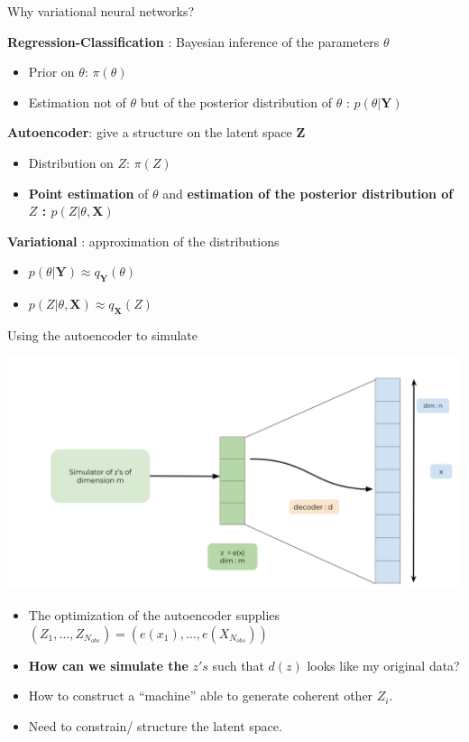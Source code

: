 \documentclass[compress,10pt]{beamer}
\begin{document}
\begin{frame}{Why variational neural networks?}

  \textbf{Regression-Classification} : Bayesian inference of the
  parameters \(\theta\)
\begin{itemize}
\item
   Prior on \(\theta\): \(\pi(\theta)\)
\item
  Estimation not of \(\theta\) but of the posterior distribution of
  \(\theta\) : \(p(\theta | \mathbf{Y})\)
\end{itemize}

  \textbf{Autoencoder}: give a structure on the latent space
  \(\mathbf{Z}\)
  
\begin{itemize}

\item
  Distribution  on \(Z\): \(\pi(Z)\)
\item
  \textbf{Point estimation} of \(\theta\) and \textbf{estimation of  the posterior distribution of \(Z\) :
  \(p(Z | \theta, \mathbf{X})\)}
\end{itemize}


 \textbf{Variational} : approximation of the distributions
\begin{itemize}
 \item
  \(p(\theta | \mathbf{Y}) \approx q_\mathbf{Y}(\theta)\)
\item
  \(p(Z | \theta, \mathbf{X}) \approx q_\mathbf{X}(Z)\)
\end{itemize}
\end{frame}

\begin{frame}{Using the autoencoder to simulate}
\protect\hypertarget{using-the-autoencoder-to-simulate}{}
\begin{center}\includegraphics[width=0.7\linewidth]{images/VarAutoencoder} \end{center}

\begin{itemize}
\item
  The optimization of the autoencoder supplies
  \((Z_1, \dots, Z_{N_{obs}}) = (e(x_1), \dots, e(X_{N_{obs}}))\)
\item
  \textbf{How can we simulate the} \(z's\) such that \(d(z)\) looks like
  my original data?
\item
  How to construct a ``machine'' able to generate coherent other
  \(Z_i\).
\item
  Need to constrain/ structure the latent space.
\end{itemize}
\end{frame}
\end{document}
